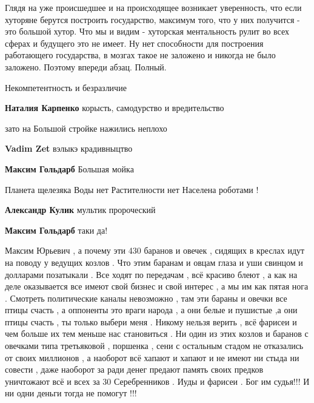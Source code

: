 \begin{itemize}
Глядя на уже происшедшее и на происходящее возникает уверенность, что если
хуторяне берутся построить государство, максимум того, что у них получится -
это большой хутор. Что мы и видим - хуторская ментальность рулит во всех сферах
и будущего это не имеет. Ну нет способности для построения работающего
государства, в мозгах такое не заложено и никогда не было заложено. Поэтому
впереди абзац. Полный.


Некомпетентность и безразличие

\textbf{Наталия Карпенко} корысть, самодурство и вредительство


зато на Большой стройке нажились неплохо

\begin{itemize} %
\textbf{Vadim Zet} вэлыкэ крадивныцтво

\textbf{Максим Гольдарб} Большая мойка
\end{itemize} %

Планета щелезяка
Воды нет
Растителности нет
Населена роботами !

\begin{itemize} %
\textbf{Александр Кулик} мультик пророческий

\textbf{Максим Гольдарб} таки да!
\end{itemize} %


Максим Юрьевич , а почему эти 430 баранов и овечек , сидящих в креслах идут на
поводу у ведущих козлов . Что этим баранам и овцам глаза и уши свинцом и
долларами позатыкали . Все ходят по передачам , всё красиво блеют , а как на
деле оказывается все имеют свой бизнес и свой интерес , а мы им как пятая нога
. Смотреть политические каналы невозможно , там эти бараны и овечки все птицы
счасть , а оппоненты это враги народа , а они белые и пушистые ,а они птицы
счасть , ты только выбери меня . Никому нельзя верить , всё фарисеи и чем
больше их тем меньше нас становиться . Ни один из этих козлов и баранов с
овечками типа третьяковой , поршенка , сени с остальным стадом не отказались от
своих миллионов , а наоборот всё хапают и хапают и не имеют ни стыда ни совести
, даже наоборот за ради денег предают память своих предков уничтожают всё и
всех за 30 Серебренников . Иуды и фарисеи . Бог им судья!!! И ни одни деньги
тогда не помогут !!!


\end{itemize}
